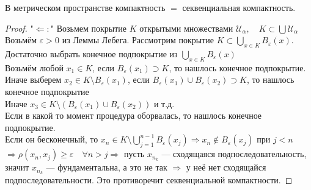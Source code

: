 \begin{theorem-non}
    В метрическом пространстве компактность $=$ секвенциальная компактность.

    \begin{proof}
        "$\Longleftarrow:$" Возьмем покрытие $K$ открытыми множествами $\mathcal{U_{\alpha}}, \quad K \subset \bigcup \mathcal{U_{\alpha}}$ \\
        Возьмём $\varepsilon > 0$ из Леммы Лебега. Рассмотрим покрытие $K \subset \bigcup\limits_{x \in K} B_{\varepsilon}(x)$. \\
        Достаточно выбрать конечное подпокрытие из $\bigcup\limits_{x \in K}B_{\varepsilon}(x)$ \\
        Возьмём любой $x_1 \in K$, если $B_{\varepsilon}(x_1) \supset K$, то нашлось конечное подпокрытие. \\
        Иначе выберем $x_2 \in K \setminus B_{\varepsilon}(x_1)$, если $B_{\varepsilon}(x_1) \cup B_{\varepsilon}(x_2) \supset K$, то нашлось конечное подпокрытие \\
        Иначе $x_3 \in K \setminus (B_{\varepsilon}(x_1) \cup B_{\varepsilon}(x_2))$ и т.д.  \\
        Если в какой то момент процедура оборвалась, то нашлось конечное подпокрытие. \\
        Если он бесконечный, то $x_n \in K \setminus \bigcup\limits_{j = 1}^{n - 1} B_{\varepsilon}(x_j) \Longrightarrow x_n \notin B_{\varepsilon}(x_j)$ при $j < n$ 
        $\Longrightarrow \rho(x_n, x_j) \geqslant \varepsilon \quad \forall n > j \Longrightarrow$ пусть $x_{n_k}$ --- сходящаяся подпоследовательность, значит $x_{n_k}$ --- фундаментальна, а это не так
        $\Longrightarrow$ у неё нет сходящайся подпоследовательности. Это противоречит секвенциальной компактности.
    \end{proof}

\end{theorem-non}